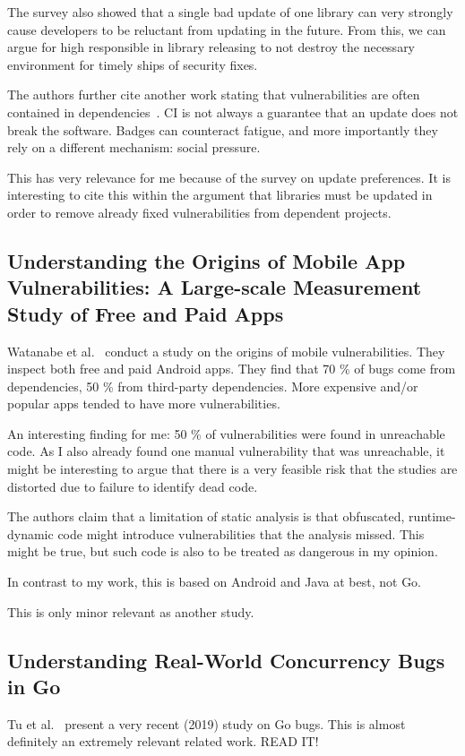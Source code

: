 The survey also showed that a single bad update of one library can very strongly cause developers to be reluctant from
updating in the future.
From this, we can argue for high responsible in library releasing to not destroy the necessary environment for timely
ships of security fixes.

The authors further cite another work stating that vulnerabilities are often contained in dependencies~\cite{xia2014}.
CI is not always a guarantee that an update does not break the software.
Badges can counteract fatigue, and more importantly they rely on a different mechanism: social pressure.

This has very relevance for me because of the survey on update preferences.
It is interesting to cite this within the argument that libraries must be updated in order to remove already fixed
vulnerabilities from dependent projects.



\subsection{Understanding the Origins of Mobile App Vulnerabilities: A Large-scale Measurement Study of Free and Paid Apps}
\label{subsec:understanding-the-origins-of-mobile-app-vulnerabilities:-a-large-scale-measurement-study-of-free-and-paid-apps}

Watanabe et al.~\cite{watanabe2017} conduct a study on the origins of mobile vulnerabilities.
They inspect both free and paid Android apps.
They find that 70 \% of bugs come from dependencies, 50 \% from third-party dependencies.
More expensive and/or popular apps tended to have more vulnerabilities.

An interesting finding for me: 50 \% of vulnerabilities were found in unreachable code.
As I also already found one manual vulnerability that was unreachable, it might be interesting to argue that there is a
very feasible risk that the studies are distorted due to failure to identify dead code.

The authors claim that a limitation of static analysis is that obfuscated, runtime-dynamic code might introduce
vulnerabilities that the analysis missed.
This might be true, but such code is also to be treated as dangerous in my opinion.

In contrast to my work, this is based on Android and Java at best, not Go.

This is only minor relevant as another study.



\subsection{Understanding Real-World Concurrency Bugs in Go}
\label{subsec:understanding-real-world-concurrency-bugs-in-go}

Tu et al.~\cite{tu2019} present a very recent (2019) study on Go bugs. This is almost definitely an extremely relevant
related work. READ IT!
